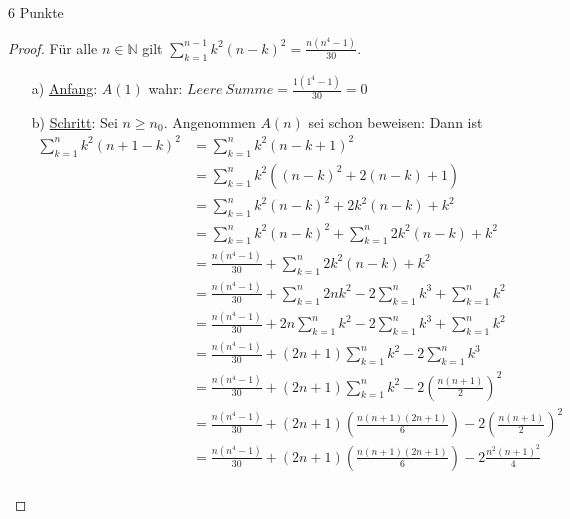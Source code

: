 \documentclass{../problemset}
\begin{document}
\begin{problem}[Summenformeln]{6 Punkte}
\begin{proof}
	Für alle $n \in \mathbb{N}$ gilt $\sum_{k = 1}^{n - 1} k^2(n - k)^2 = \frac{n(n^4 - 1)}{30}$.
	\begin{enumerate}
		\item[a)] \underline{Anfang}: $A(1)$ wahr: $Leere\ Summe = \frac{1(1^4 - 1)}{30} = 0$
		\item[b)] \underline{Schritt}: Sei $n \ge n_0$. Angenommen $A(n)$ sei schon beweisen: Dann ist
		      \begin{align}
			      \sum_{k = 1}^{n} k^2(n + 1 - k)^2 & = \sum_{k = 1}^{n} k^2(n - k + 1)^2                                                                       \\
			                                        & = \sum_{k = 1}^{n} k^2((n - k)^2 + 2(n-k)+ 1)                                                             \\
			                                        & = \sum_{k = 1}^{n} k^2(n - k)^2 + 2k^2(n-k) + k^2                                                         \\
			                                        & = \sum_{k = 1}^{n} k^2(n - k)^2 + \sum_{k=1}^{n} 2k^2(n-k) + k^2                                          \\
			                                        & = \frac{n(n^4 - 1)}{30} + \sum_{k=1}^{n} 2k^2(n-k) + k^2                                                  \\
			                                        & = \frac{n(n^4 - 1)}{30} + \sum_{k=1}^{n} 2nk^2 - 2\sum_{k=1}^{n} k^3 + \sum_{k=1}^{n} k^2                 \\
			                                        & = \frac{n(n^4 - 1)}{30} + 2n\sum_{k=1}^{n} k^2 - 2\sum_{k=1}^{n} k^3 + \sum_{k=1}^{n} k^2                 \\
			                                        & = \frac{n(n^4 - 1)}{30} + (2n+1)\sum_{k=1}^{n} k^2 - 2\sum_{k=1}^{n} k^3 \tag{aus 1.a}                    \\
			                                        & = \frac{n(n^4 - 1)}{30} + (2n+1)\sum_{k=1}^{n} k^2 - 2\left(\frac{n(n+1)}{2}\right)^2 \tag{aus Vorlesung} \\
			                                        & = \frac{n(n^4 - 1)}{30} + (2n+1)\left(\frac{n(n+1)(2n+1)}{6}\right) - 2\left(\frac{n(n+1)}{2}\right)^2    \\
			                                        & = \frac{n(n^4 - 1)}{30} + (2n+1)\left(\frac{n(n+1)(2n+1)}{6}\right) - 2\frac{n^2(n+1)^2}{4}               \\

\end{align}
\end{enumerate}
\end{proof}
\end{problem}
\end{document}
